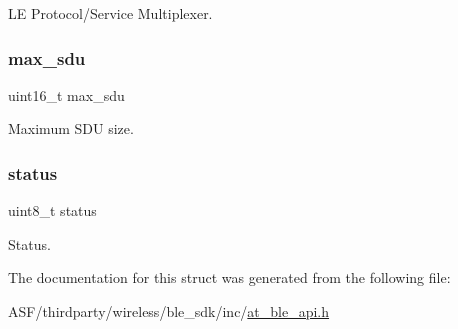 LE Protocol/\+Service Multiplexer. 

\mbox{\label{structat__ble__lecb__connected__t_a4b5effde26a738c2ddaad78c595bf745}} 
\subsubsection{\texorpdfstring{max\_sdu}{max\_sdu}}
{\footnotesize\ttfamily uint16\+\_\+t max\+\_\+sdu}



Maximum S\+DU size. 

\mbox{\label{structat__ble__lecb__connected__t_ade818037fd6c985038ff29656089758d}} 
\subsubsection{\texorpdfstring{status}{status}}
{\footnotesize\ttfamily uint8\+\_\+t status}



Status. 



The documentation for this struct was generated from the following file\+:\begin{DoxyCompactItemize}
\item 
A\+S\+F/thirdparty/wireless/ble\+\_\+sdk/inc/\mbox{\hyperlink{at__ble__api_8h}{at\+\_\+ble\+\_\+api.\+h}}\end{DoxyCompactItemize}
